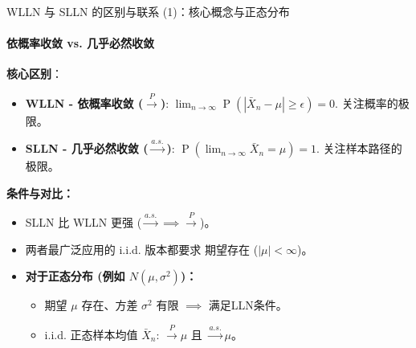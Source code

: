 \documentclass[UTF8]{beamer}
\DeclareMathOperator{\Prob}{\operatorname{P}}
\begin{document}
\begin{frame}[shrink=5]{WLLN 与 SLLN 的区别与联系 (1)：核心概念与正态分布}
    \framesubtitle{依概率收敛 vs. 几乎必然收敛}
    \textbf{核心区别}：
    \begin{itemize}
        \item \textbf{WLLN - \alert{依概率收敛} ($\xrightarrow{P}$)}: $\lim_{n \to \infty} \Prob(|\bar{X}_n - \mu| \geq \epsilon) = 0$. 关注\alert{概率}的极限。
        \item \textbf{SLLN - \alert{几乎必然收敛} ($\xrightarrow{a.s.}$)}: $\Prob(\lim_{n \to \infty} \bar{X}_n = \mu) = 1$. 关注\alert{样本路径}的极限。
    \end{itemize}
    \pause
    \textbf{条件与对比：}
    \begin{itemize}
        \item SLLN 比 WLLN \alert{更强} ($\xrightarrow{a.s.} \implies \xrightarrow{P}$)。
        \item 两者最广泛应用的 i.i.d. 版本都要求 \alert{期望存在} ($|\mu| < \infty$)。
        \item \textbf{对于正态分布 (例如 $N(\mu, \sigma^2)$)：}
            \begin{itemize}
                \item 期望 $\mu$ 存在、方差 $\sigma^2$ 有限 $\implies$ 满足LLN条件。
                \item i.i.d. 正态样本均值 $\bar{X}_n$: $\xrightarrow{P} \mu$ 且 $\xrightarrow{a.s.} \mu$。
            \end{itemize}
    \end{itemize}
\end{frame}
\end{document}

